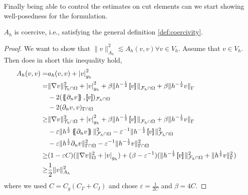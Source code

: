 Finally being able to control the estimates on cut elements can we start showing well-posedness for the formulation.

\begin{lemma}
    $A_{h}$ is coercive, i.e., satisfying the general definition \ref{def:coercivity}.
\end{lemma}
\begin{proof}
We want to show that $  \| v \|_{A_{h}}^{2}   \lesssim A_{h}( v,v) \forall v \in V_{h} $.
    Assume that $v \in V_{h} $. Then does in short this inequality hold,
\[
    \begin{split}
A_{h}( v, v)   =& a_{h}( v, v) + \left\lvert v \right\rvert _{g_{h}}^{2} \\
=&  \| \nabla v \|_{  \mathcal{T}_{h} \cap \Omega }^{ 2 } + \left\lvert v \right\rvert _{ g_{h} }^{ 2 } + \beta \| h^{-\frac{1}{2}} \jump{ v }   \|_{\mathcal{F} _{h} \cap \Omega   }^{  }   + \beta \| h^{-\frac{1}{2}}  v    \|_{ \Gamma}^{  }
\\ & - 2( \mean{ \partial _{n} v  },  \jump{ v })_{\mathcal{F} _{h} \cap \Omega }
\\ & - 2 ( \partial _{n} v,v)_{\Gamma \cap \Omega }     \\
\ge  &  \| \nabla v \|_{  \mathcal{T}_{h} \cap \Omega }^{ 2 } + \left\lvert v \right\rvert_{ g_{h} }^{ 2 } + \beta \| h^{-\frac{1}{2}} \jump{ v }   \|_{\mathcal{F} _{h} \cap \Omega   }^{  }   + \beta \| h^{-\frac{1}{2}}  v    \|_{ \Gamma}^{  }
\\ & - \varepsilon \| h^{\frac{1}{2}}  \mean{  \partial _{n} v}      \|_{ \mathcal{F} _{h} \cap \Omega  }^{2  } - \varepsilon ^{-1} \| h^{-\frac{1}{2}} \jump{ v }   \|_{\mathcal{F} _{h} \cap \Omega   }^{ 2 }
\\ & - \varepsilon \| h^{\frac{1}{2}} \partial _{n} v \|_{ \Gamma \cap \Omega  }^{2  } -  \varepsilon ^{-1} \| h^{-\frac{1}{2}} v \|_{  \Gamma \cap  \Omega }^{ 2 } \\
\ge & ( 1-\varepsilon C)  ( \| \nabla v \|_{\Omega   }^{2  } + \left\lvert v \right\rvert _{g_{h}}   ) + ( \beta - \varepsilon ^{-1} ) ( \| h^{-\frac{1}{2}} \jump{ v }   \|_{ \mathcal{F} _{h}\cap  \Omega  }^{ 2 } + \| h^{\frac{1}{2}} v \|_{\Gamma
}^{  2}  )    \\
\ge & \frac{1}{2} \| v \|_{ A_{h} }^{ 2 }
    \end{split}
\]
where we used $C= C_{g} ( C_{\Gamma } + C_{I}) $ and chose $\varepsilon = \frac{1}{2C}$ and $\beta  = 4C$.


\end{proof}
